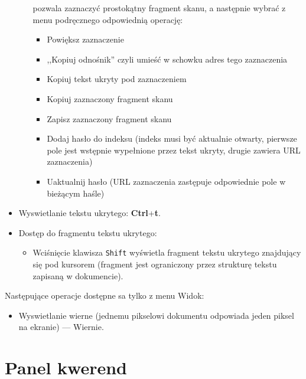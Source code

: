 \documentclass{mwart}
\def\key#1{\textbf{#1}}
\begin{document}
\begin{itemize}
\begin{itemize}
      pozwala zaznaczyć prostokątny fragment skanu, a następnie wybrać z
      menu podręcznego odpowiednią operację:
      \begin{itemize}
      \item Powiększ zaznaczenie
      \item ,,Kopiuj odnośnik'' czyli umieść w schowku adres tego zaznaczenia
      \item Kopiuj tekst ukryty pod zaznaczeniem
      \item Kopiuj zaznaczony fragment skanu
      \item Zapisz zaznaczony fragment skanu
      \item Dodaj hasło do indeksu (indeks musi być aktualnie otwarty,
        pierwsze pole jest wstępnie wypełnione przez tekst ukryty,
        drugie zawiera URL zaznaczenia)
      \item Uaktualnij hasło (URL zaznaczenia zastępuje odpowiednie pole w bieżącym haśle)
      \end{itemize}
    \end{itemize}
  \item Wyswietlanie tekstu ukrytego: \key{Ctrl}+\key{t}.
  \item Dostęp do fragmentu tekstu ukrytego:
    \begin{itemize}
    \item Wciśnięcie klawisza \texttt{Shift} wyświetla fragment tekstu
      ukrytego znajdujący się pod kursorem (fragment jest ograniczony
      przez strukturę tekstu zapisaną w dokumencie).
    \end{itemize}
  \end{itemize}
  Następujące operacje dostępne sa tylko z menu \textsf{Widok}:
  \begin{itemize}
  \item Wyswietlanie wierne (jednemu pikselowi dokumentu odpowiada
    jeden piksel na ekranie) --- \textsf{Wiernie}.
  \end{itemize}

\section{Panel kwerend}
\label{sec:panel-kwerend}
\end{document}
